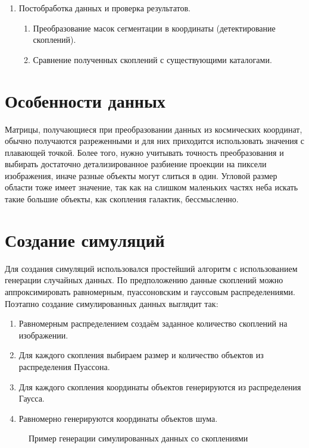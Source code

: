 \begin{enumerate}
    \item Постобработка данных и проверка результатов.
    \begin{enumerate}
        \item Преобразование масок сегментации в координаты (детектирование скоплений).
        \item Сравнение полученных скоплений с существующими каталогами.
    \end{enumerate}
\end{enumerate}

\section{Особенности данных}
Матрицы, получающиеся при преобразовании данных из космических 
координат, обычно получаются разреженными и для них приходится использовать значения с плавающей 
точкой. Более того, нужно учитывать точность преобразования и выбирать достаточно детализированное 
разбиение проекции на пиксели изображения, иначе разные объекты могут слиться в один. Угловой 
размер области тоже имеет значение, так как на слишком маленьких частях неба искать такие большие 
объекты, как скопления галактик, бессмысленно.\\


\section{Создание симуляций}
Для создания симуляций использовался простейший алгоритм с использованием генерации случайных 
данных. По предположению данные скоплений можно аппроксимировать равномерным, пуассоновским и 
гауссовым распределениями.
Поэтапно создание симулированных данных выглядит так:

\begin{enumerate}
	\item Равномерным распределением создаём заданное количество скоплений на изображении.
	\item Для каждого скопления выбираем размер и количество объектов из распределения Пуассона.
	\item Для каждого скопления координаты объектов генерируются из распределения Гаусса.
	\item Равномерно генерируются координаты объектов шума.
\end{enumerate}

\begin{figure}[h]
    \caption{Пример генерации симулированных данных со скоплениями}
\end{figure}


